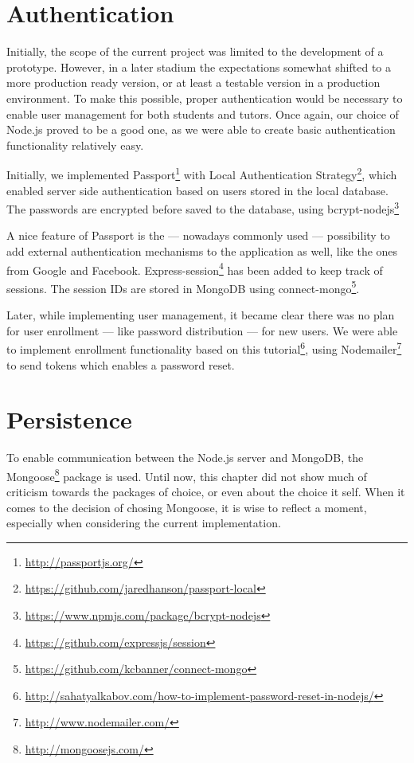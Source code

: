 \section{Authentication}
Initially, the scope of the current project was limited to the development of a
prototype. However, in a later stadium the expectations somewhat shifted to a
more production ready version, or at least a testable version in a production
environment. To make this possible, proper authentication would be necessary to
enable user management for both students and tutors. Once again, our choice of 
Node.js proved to be a good one, as we were able to create basic authentication
functionality relatively easy. 

Initially, we implemented Passport\footnote{\url{http://passportjs.org/}} 
with Local Authentication 
Strategy\footnote{\url{https://github.com/jaredhanson/passport-local}}, 
which enabled server side authentication based on users stored in the local
database. The passwords are encrypted before saved to the database, using
bcrypt-nodejs\footnote{\url{https://www.npmjs.com/package/bcrypt-nodejs}}

A nice feature of Passport is the --- nowadays commonly used --- 
possibility to add external authentication mechanisms to the application as 
well, like the ones from Google and Facebook. 
Express-session\footnote{\url{https://github.com/expressjs/session}}
has been added to keep track of sessions. The session IDs are stored in MongoDB using 
connect-mongo\footnote{\url{https://github.com/kcbanner/connect-mongo}}. 

Later, while implementing user management, it became clear there was no plan for
user enrollment --- like password distribution --- for new users. We were able to
implement enrollment functionality based on this
tutorial\footnote{\url{http://sahatyalkabov.com/how-to-implement-password-reset-in-nodejs/}},
using Nodemailer\footnote{\url{http://www.nodemailer.com/}} to send tokens
which enables a password reset.

\section{Persistence}
To enable communication between the Node.js server and MongoDB, the 
Mongoose\footnote{\url{http://mongoosejs.com/}}
package is used. Until now, this chapter did not show much of criticism towards 
the packages of choice, or even about the choice it self. When it comes to the 
decision of chosing Mongoose, it is wise to reflect a moment, especially when 
considering the current implementation.

